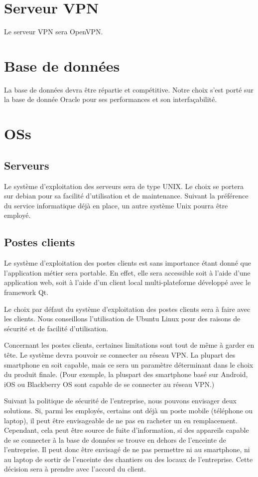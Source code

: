 \section{Serveur VPN}
    Le serveur VPN sera OpenVPN.

\section{Base de données}
    La base de données devra être répartie et compétitive.
    Notre choix s'est porté sur la base de donnée Oracle pour ses performances et son interfaçabilité.

\section{OSs}
    \subsection{Serveurs}
        Le système d'exploitation des serveurs sera de type UNIX.
        Le choix se portera sur debian pour sa facilité d'utilisation et de maintenance. Suivant la préférence du service informatique déjà en place, un autre système Unix pourra être employé.
    \subsection{Postes clients}
        Le système d'exploitation des postes clients est sans importance étant donné que l'application métier sera portable. En effet, elle sera accessible soit à l'aide d'une application web, soit à l'aide d'un client local multi-plateforme développé avec le framework Qt.

        Le choix par défaut du système d'exploitation des postes clients sera à faire avec les clients. Nous conseillons l'utilisation de Ubuntu Linux pour des raisons de sécurité et de facilité d'utilisation.

        Concernant les postes clients, certaines limitations sont tout de même à garder en tête. Le système devra pouvoir se connecter au réseau VPN. La plupart des smartphone en soit capable, mais ce sera un paramètre déterminant dans le choix du produit finale.
        (Pour exemple, la pluspart des smartphone basé sur Android, iOS ou Blackberry OS sont capable de se connecter au réseau VPN.)

        Suivant la politique de sécurité de l'entreprise, nous pouvons envisager deux solutions.
        Si, parmi les employés, certains ont déjà un poste mobile (téléphone ou laptop), il peut être envisageable de ne pas en racheter un en remplacement. Cependant, cela peut être source de fuite d'information, si des appareils capable de se connecter à la base de données se trouve en dehors de l'enceinte de l'entreprise.
        Il peut donc être envisagé de ne pas permettre ni au smartphone, ni au laptop de sortir de l'enceinte des chantiers ou des locaux de l'entreprise. Cette décision sera à prendre avec l'accord du client.
